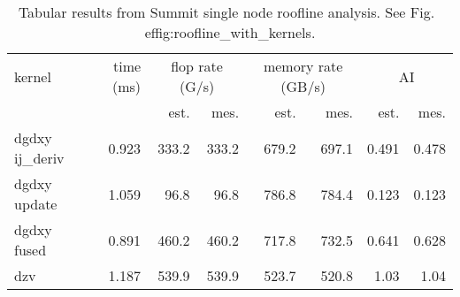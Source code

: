\begin{table*}[htb]
  \centering
  \begin{tabular}{|l|r|rr|rr|rr|}
  \hline
  kernel & time (ms) & \multicolumn{2}{|c|}{flop rate (G/s)}& \multicolumn{2}{|c|}{memory rate (GB/s)} & \multicolumn{2}{|c}{AI} \\
         &      & est. & mes. & est. & mes. & est. & mes. \\
  \hline
  dgdxy ij{\_}deriv & 0.923 & 333.2 & 333.2 & 679.2 & 697.1 & 0.491 & 0.478 \\
  dgdxy update     & 1.059 &  96.8 &  96.8 & 786.8 & 784.4 & 0.123 & 0.123 \\
  dgdxy fused      & 0.891 & 460.2 & 460.2 & 717.8 & 732.5 & 0.641 & 0.628 \\
  dzv              & 1.187 & 539.9 & 539.9 & 523.7 & 520.8 &  1.03 &  1.04 \\
  \hline
  \end{tabular}
  \caption{Tabular results from Summit single node roofline analysis. See Fig.~
ef{fig:roofline_with_kernels}.}
  \label{tab:roofline}
\end{table*}
